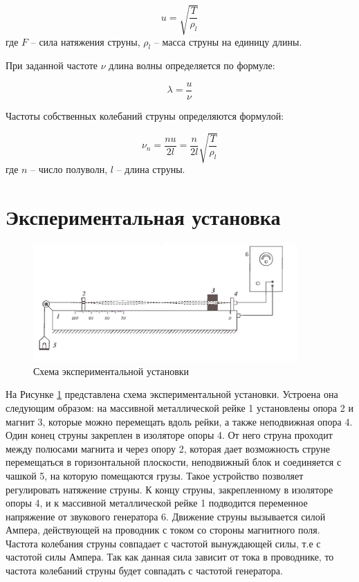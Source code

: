 \documentclass[a4paper,12pt]{article}
\begin{document}
	\begin{equation}
		u = \sqrt{\frac{T}{\rho_l}}
		\label{velocity_of_deformation}
	\end{equation}
	где $F$ -- сила натяжения струны, $\rho_{l}$ -- масса струны на единицу длины.
	
	При заданной частоте $\nu$ длина волны определяется по формуле:
	
	\begin{equation}
		\lambda = \frac{u}{\nu}
	\end{equation}
	
	Частоты собственных колебаний струны определяются формулой:
	
	\begin{equation}
		\nu_{n} = \frac{nu}{2l} = \frac{n}{2l}\sqrt{\frac{T}{\rho_l}}
		\label{frequency_velocity_equation}
	\end{equation}
	где $n$ -- число полуволн, $l$ -- длина струны.
	
	\section{Экспериментальная установка}
	
	\begin{figure}[h!]
		\begin{center}
			\includegraphics[width = 0.9\textwidth]{1.4.5 ustan}
			\caption{Схема экспериментальной установки}
			\label{facility}
		\end{center}
	\end{figure}
	
	На Рисунке \ref{facility} представлена схема экспериментальной установки. Устроена она следующим образом: на массивной металлической рейке 1 установлены опора 2 и магнит 3, которые можно перемещать вдоль рейки, а также неподвижная опора 4. Один конец струны закреплен в изоляторе опоры 4. От него струна проходит между полюсами магнита и через опору 2, которая дает возможность струне перемещаться в горизонтальной плоскости, неподвижный блок и соединяется с чашкой 5, на которую помещаются грузы. Такое устройство позволяет регулировать натяжение струны.  К концу струны, закрепленному в изоляторе опоры 4, и к массивной металлической рейке 1 подводится переменное напряжение от звукового генератора 6. Движение струны вызывается силой Ампера, действующей на проводник с током со стороны магнитного поля. Частота колебания струны совпадает с частотой вынуждающей силы, т.е с частотой силы Ампера. Так как данная сила зависит от тока в проводнике, то частота колебаний струны будет совпадать с частотой генератора.
	
\end{document}
